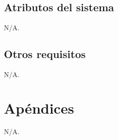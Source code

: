 \documentclass[11pt,a4paper]{article}
\begin{document}
\subsection{Atributos del sistema}
\label{sec:orgd0babc0}

N/A.

\subsection{Otros requisitos}
\label{sec:org31d2978}

N/A.

\newpage


\section{Apéndices}
\label{sec:org75cea03}

N/A.
\end{document}
